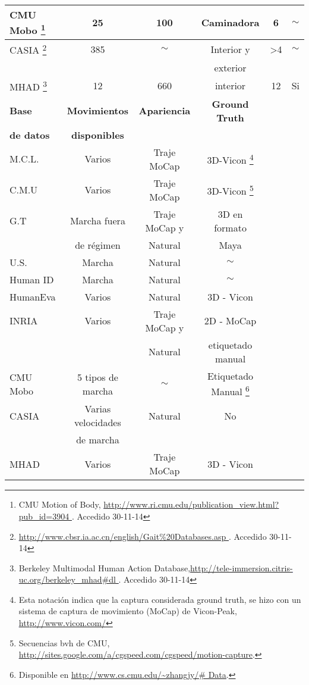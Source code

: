 \begin{table}[h!]
\begin{minipage}{\textwidth}
\begin{tabular}{||l|ccccc||}
CMU Mobo \footnote{CMU Motion of Body,  \textcolor{blue}{\underline{\url{http://www.ri.cmu.edu/publication_view.html?pub_id=3904 }}}. Accedido 30-11-14} &     25    & 100           & Caminadora &   6      &  $\sim$       \\ \hline
CASIA \footnote{ \textcolor{blue}{\underline{\url{http://www.cbsr.ia.ac.cn/english/Gait\%20Databases.asp
 }}}. Accedido 30-11-14}&     385    & $\sim$           & Interior y  &   >4      &  $\sim$       \\ 
 &         &            & exterior  &         &      \\ \hline
MHAD \footnote{Berkeley Multimodal Human Action Database,\textcolor{blue}{\underline{\url{http://tele-immersion.citris-uc.org/berkeley_mhad\#dl  }}}. Accedido 30-11-14} & 12         & 660            & interior  & 12        & Si      \\ 
\hline \hline


\rowcolor[HTML]{CBCEFB}
\textbf{Base}     & \textbf{Movimientos}  & \textbf{Apariencia}    & \textbf{Ground Truth} & & \\
\rowcolor[HTML]{CBCEFB}
\textbf{de datos} & \textbf{disponibles} &               &           & & \\
\hline \hline

{M.C.L. }   & Varios    &  Traje MoCap & 3D-Vicon \footnote{ Esta notación indica que la captura considerada ground truth, se hizo con un sistema  de captura de movimiento (MoCap) de Vicon-Peak, \textcolor{blue}{\underline{\url{http://www.vicon.com/}}} } & & \\ \hline
{C.M.U }    & Varios    &  Traje MoCap & 3D-Vicon \footnote{Secuencias bvh de CMU, \textcolor{blue}{\underline{\url{http://sites.google.com/a/cgspeed.com/cgspeed/motion-capture}}}.} & & \\ \hline
{G.T} &     Marcha fuera&     Traje MoCap y       & 3D  en formato & & \\ 
	 &	   de régimen  &  Natural   &   Maya & & \\ \hline
U.S. &       Marcha    &  Natural    &  $\sim$ & &       \\	\hline
Human ID &     Marcha    & Natural  & $\sim$ &  &       \\ \hline
HumanEva &     Varios    & Natural  & 3D - Vicon & &   \\ \hline
INRIA &       Varios    & Traje MoCap y            & 2D - MoCap &   &       \\
  &           & Natural            &   etiquetado manual  & &         \\ \hline
  CMU Mobo &     5 tipos de marcha    & $\sim$           & Etiquetado Manual \footnote{Disponible en  \textcolor{blue}{\underline{\url{http://www.cs.cmu.edu/~zhangjy/\# Data}}}.}&         &        \\ \hline
CASIA &  Varias velocidades       &   Natural         & No  &         &      \\ 
 & de marcha        &            &   &         &      \\ \hline
MHAD & Varios        & Traje MoCap            & 3D - Vicon    &   &       \\
\hline


\end{tabular}
\end{minipage}
\end{table}
